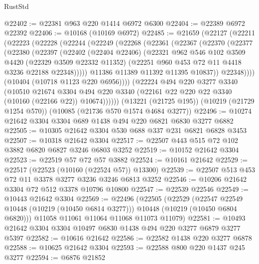 \begin{lexlean}{RustStd}
\begin{coremodule}
@22402 := @22381 @963 @220 @1414 @6972 @6300
@22404 := @22389 @6972 @22392
@22406 := @10168 (@10169 @6972)
@22485 := @21659
    (@22127
      (@22211
        (@22223
          (@22228
            (@22244
              (@22249
                (@22268
                  (@22361
                    (@22367
                      (@22370
                        (@22377
                          (@22380
                            (@22397
                              (@22402
                                (@22404 @22406)
                                (@22321
                                  @962
                                  @546
                                  @102
                                  @3509
                                  @4420
                                  (@22329 @3509 @22332 @11352)
                                  (@22251 @960 @453 @72 @11 @4418 @3236 @22188 @22348)))))
                          @11386
                          @11389
                          @11392
                          @11395
                          @10837))
                      @22348))))
              (@10404 (@10718 @1123 @220 @6956))))
          (@22224
            @494
            @220
            @3277
            @3340
            (@10510
              @21674
              @3304
              @494
              @220
              @3340
              (@22161 @22 @220 @22 @3340 (@10160 (@22166 @22)) @10674))))))
    (@13221 (@21725 @195))
    (@10219 (@21729 @1254 @570))
    (@10085 (@21736 @570 @1574 @4684 @3277))
@22496 := @10274 @21642 @3304 @3304 @689 @1438 @494 @220 @6821 @6830 @3277 @6882
@22505 := @10305 @21642 @3304 @530 @688 @337 @231 @6821 @6828 @3453
@22507 := @10318 @21642 @3304
@22517 := @22507 @443 @515 @72 @102 @3882 @6820 @6827 @3246 @6803 @3252
@22519 := @10152 @21642 @3304
@22523 := @22519 @57 @72 @57 @3882
@22524 := @10161 @21642
@22529 := @22517 (@22523 (@10160 (@22524 @57)) @13300)
@22539 := @22507 @513 @453 @72 @11 @3378 @3277 @3236 @3246 @6813 @3252
@22546 := @10206 @21642 @3304 @72 @512 @3378 @10796 @10800
@22547 := @22539 @22546
@22549 := @10443 @21642 @3304
@22569 := @22496
    (@22505
      (@22529
        (@22547 @22549 @10448 (@10219 (@10450 @6814 @3277)))
        @10448
        (@10219 (@10450 @6804 @6820)))
      @11058
      @11061
      @11064
      @11068
      @11073
      @11079)
@22581 := @10493 @21642 @3304 @3304 @10497 @6830 @1438 @494 @220 @3277 @6879 @3277 @5397
@22582 := @10616 @21642
@22586 := @22582 @1438 @220 @3277 @6878
@22588 := @10625 @21642 @3304
@22593 := @22588 @800 @220 @1437 @245 @3277
@22594 := @6876 @21852

\end{coremodule}
\end{lexlean}
